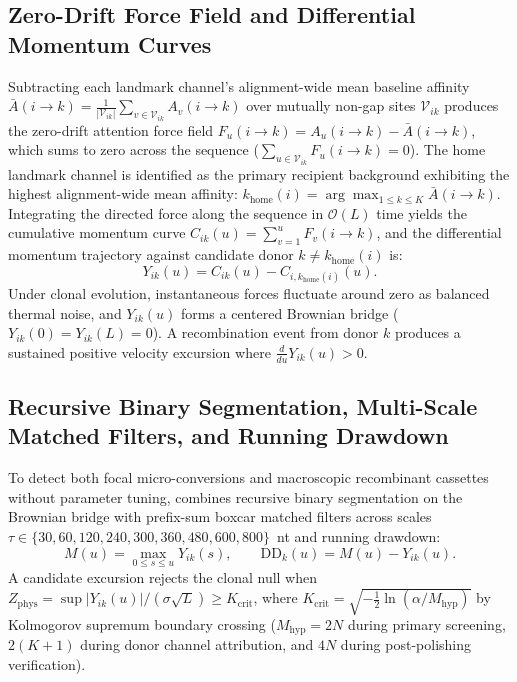 \subsection{Zero-Drift Force Field and Differential Momentum Curves}
Subtracting each landmark channel's alignment-wide mean baseline affinity $\bar{A}(i \to k) = \frac{1}{|\mathcal{V}_{ik}|}\sum_{v \in \mathcal{V}_{ik}} A_v(i \to k)$ over mutually non-gap sites $\mathcal{V}_{ik}$ produces the zero-drift attention force field $F_u(i \to k) = A_u(i \to k) - \bar{A}(i \to k)$, which sums to zero across the sequence ($\sum_{u \in \mathcal{V}_{ik}} F_u(i \to k) = 0$).
The home landmark channel is identified as the primary recipient background exhibiting the highest alignment-wide mean affinity: $k_{\mathrm{home}}(i) = \arg\max_{1 \le k \le K} \bar{A}(i \to k)$.
Integrating the directed force along the sequence in $\mathcal{O}(L)$ time yields the cumulative momentum curve $C_{ik}(u) = \sum_{v=1}^u F_v(i \to k)$, and the differential momentum trajectory against candidate donor $k \neq k_{\mathrm{home}}(i)$ is:
\begin{equation}
Y_{ik}(u) = C_{ik}(u) - C_{i, k_{\mathrm{home}}(i)}(u).
\end{equation}
Under clonal evolution, instantaneous forces fluctuate around zero as balanced thermal noise, and $Y_{ik}(u)$ forms a centered Brownian bridge ($Y_{ik}(0) = Y_{ik}(L) = 0$).
A recombination event from donor $k$ produces a sustained positive velocity excursion where $\frac{d}{du} Y_{ik}(u) > 0$.

\subsection{Recursive Binary Segmentation, Multi-Scale Matched Filters, and Running Drawdown}
To detect both focal micro-conversions and macroscopic recombinant cassettes without parameter tuning, \RhizAeon combines recursive binary segmentation on the Brownian bridge with prefix-sum boxcar matched filters across scales $\tau \in \{30, 60, 120, 240, 300, 360, 480, 600, 800\}$~nt and running drawdown:
\begin{equation}
M(u) = \max_{0 \le s \le u} Y_{ik}(s), \qquad \mathrm{DD}_k(u) = M(u) - Y_{ik}(u).
\end{equation}
A candidate excursion rejects the clonal null when $Z_{\mathrm{phys}} = \sup |Y_{ik}(u)| / (\sigma \sqrt{L}) \ge K_{\mathrm{crit}}$, where $K_{\mathrm{crit}} = \sqrt{-\frac{1}{2} \ln(\alpha / M_{\mathrm{hyp}})}$ by Kolmogorov supremum boundary crossing ($M_{\mathrm{hyp}} = 2N$ during primary screening, $2(K+1)$ during donor channel attribution, and $4N$ during post-polishing verification).

